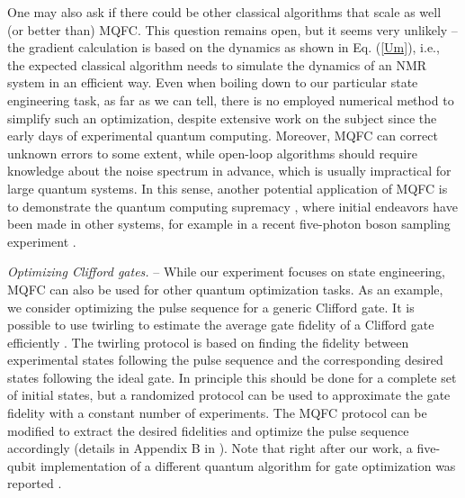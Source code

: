 \documentclass[twocolumn,reprint, amsmath,amssymb,showpacs,superscriptaddress]{revtex4-1}
\begin{document}
One may also ask if there could be other classical algorithms that scale as well (or better than) MQFC. This question remains open, but it seems very unlikely -- the gradient calculation is based on the dynamics as shown in Eq. (\ref{Um}), i.e., the expected classical algorithm needs to simulate the dynamics of an NMR system in an efficient way. Even when boiling down to our particular state engineering task, as far as we can tell, there is no employed numerical method \cite{daley2014quantum,mascarenhas2015matrix,lloyd2014information} to simplify such an optimization, despite extensive work on the subject since the early days of experimental quantum computing. Moreover, MQFC can correct unknown errors to some extent, while   open-loop algorithms should require knowledge about   the noise spectrum in advance, which is usually  impractical for large quantum systems. In this sense, another potential application of MQFC is to demonstrate the quantum computing supremacy \cite{preskill2012quantum}, where initial endeavors have been made in other systems, for example in a recent  five-photon boson sampling experiment  \cite{wang2017high}.

\emph{Optimizing Clifford gates.} -- While our experiment focuses on state engineering,  MQFC can also be used for other quantum optimization tasks.  As an example, we consider optimizing the pulse sequence for a generic Clifford gate.  It is possible to use twirling to estimate the average gate fidelity of a Clifford gate efficiently  \cite{lu2015experimental}.  The twirling protocol is based on finding the fidelity between  experimental states following the pulse sequence and the corresponding desired states following the ideal gate.  In principle this should be done for a complete set of initial states, but a randomized protocol can be used to approximate the gate fidelity with a constant number of experiments.  The MQFC protocol can be modified to extract the desired fidelities and optimize the pulse sequence accordingly (details in Appendix B in \cite{supple}).  Note that right after our work, a five-qubit implementation of a different quantum algorithm for gate optimization was reported \cite{dive2017situ}.
\end{document}
